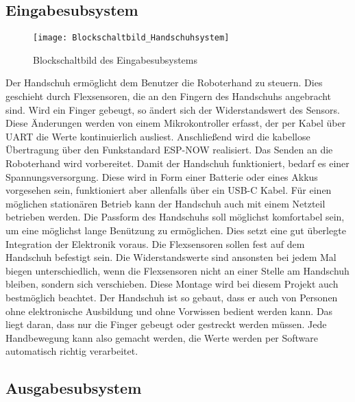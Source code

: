 \documentclass[titlepage,12pt,twoside]{article}
\begin{document}
\subsection{Eingabesubsystem}
\label{chap:Eingabesubsystem}
\begin{figure}[H]
	\begin{center}
		\scalebox{0.7}
		{\texttt{[image: Blockschaltbild\_Handschuhsystem]}}
		\caption{Blockschaltbild des Eingabesubsystems}
		\label{fig:Blockschaltbild_Handschuhsystem}			
	\end{center}
\end{figure}
\hfill \break
Der Handschuh ermöglicht dem Benutzer die Roboterhand zu steuern. Dies geschieht 
durch Flexsensoren, die an den Fingern des Handschuhs angebracht sind. Wird ein 
Finger gebeugt, so ändert sich der Widerstandswert des Sensors. Diese Änderungen 
werden von einem Mikrokontroller erfasst, der per Kabel über UART die Werte 
kontinuierlich ausliest. Anschließend wird die kabellose Übertragung über den 
Funkstandard ESP-NOW realisiert. Das Senden an die Roboterhand wird vorbereitet. 
Damit der Handschuh funktioniert, bedarf es einer Spannungsversorgung. Diese wird 
in Form einer Batterie oder eines Akkus vorgesehen sein, funktioniert aber allenfalls 
über ein USB-C Kabel. Für einen möglichen stationären Betrieb kann der Handschuh 
auch mit einem Netzteil betrieben werden. Die Passform des Handschuhs soll 
möglichst komfortabel sein, um eine möglichst lange Benützung zu ermöglichen. 
Dies setzt eine gut überlegte Integration der Elektronik voraus. Die Flexsensoren 
sollen fest auf dem Handschuh befestigt sein. Die Widerstandswerte sind ansonsten 
bei jedem Mal biegen unterschiedlich, wenn die Flexsensoren nicht an einer Stelle 
am Handschuh bleiben, sondern sich verschieben. Diese Montage wird bei diesem 
Projekt auch bestmöglich beachtet. Der Handschuh ist so gebaut, dass er auch von 
Personen ohne elektronische Ausbildung und ohne Vorwissen bedient werden kann. 
Das liegt daran, dass nur die Finger gebeugt oder gestreckt werden müssen. Jede 
Handbewegung kann also gemacht werden, die Werte werden per Software automatisch 
richtig verarbeitet. \\

\subsection{Ausgabesubsystem}
\label{chap:Ausgabesubsystem}
\end{document}
